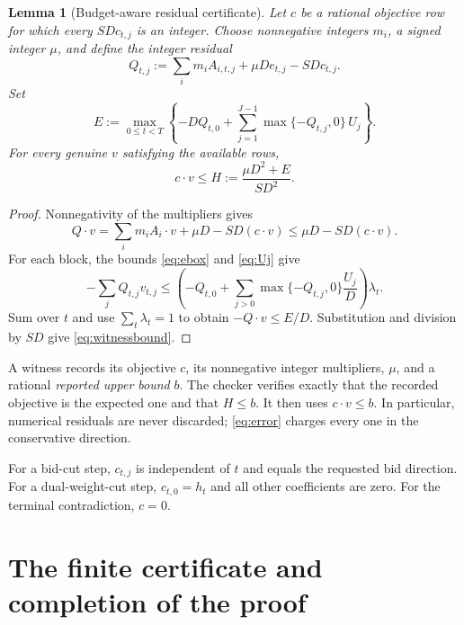 \documentclass[11pt]{article}
\numberwithin{equation}{section}
\newtheorem{lemma}[theorem]{Lemma}
\theoremstyle{definition}
\begin{document}
\begin{lemma}[Budget-aware residual certificate]\label{lem:residual}
Let $c$ be a rational objective row for which every $SDc_{t,j}$ is an
integer. Choose nonnegative integers $m_i$, a signed integer $\mu$, and
define the integer residual
\begin{equation}\label{eq:Q}
 Q_{t,j}:=\sum_im_iA_{i,t,j}+\mu D e_{t,j}-SDc_{t,j}.
\end{equation}
Set
\begin{equation}\label{eq:error}
 E:=\max_{0\le t<T}\left\{
 -DQ_{t,0}+\sum_{j=1}^{J-1}\max\{-Q_{t,j},0\}\,U_j
 \right\}.
\end{equation}
For every genuine $v$ satisfying the available rows,
\begin{equation}\label{eq:witnessbound}
 c\cdot v\le H:=\frac{\mu D^2+E}{SD^2}.
\end{equation}
\end{lemma}
\begin{proof}
Nonnegativity of the multipliers gives
\[
 Q\cdot v
 =\sum_im_iA_i\cdot v+\mu D-SD(c\cdot v)
 \le\mu D-SD(c\cdot v).
\]
For each block, the bounds \eqref{eq:ebox} and \eqref{eq:Uj} give
\[
 -\sum_jQ_{t,j}v_{t,j}
 \le\left(-Q_{t,0}+\sum_{j>0}
       \max\{-Q_{t,j},0\}\frac{U_j}{D}\right)\lambda_t.
\]
Sum over $t$ and use $\sum_t\lambda_t=1$ to obtain
$-Q\cdot v\le E/D$. Substitution and division by $SD$ give
\eqref{eq:witnessbound}.
\end{proof}

A witness records its objective $c$, its nonnegative integer multipliers,
$\mu$, and a rational \emph{reported upper bound} $b$. The checker verifies
exactly that the recorded objective is the expected one and that $H\le b$.
It then uses $c\cdot v\le b$. In particular, numerical residuals are never
discarded; \eqref{eq:error} charges every one in the conservative direction.

For a bid-cut step, $c_{t,j}$ is independent of $t$ and equals the requested
bid direction. For a dual-weight-cut step, $c_{t,0}=h_t$ and all other
coefficients are zero. For the terminal contradiction, $c=0$.

\section{The finite certificate and completion of the proof}\label{sec:finish}
\end{document}
